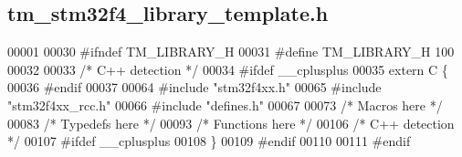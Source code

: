\hypertarget{tm__stm32f4__library__template_8h_source}{}\subsection{tm\+\_\+stm32f4\+\_\+library\+\_\+template.\+h}

\begin{DoxyCode}
00001 
00030 \textcolor{preprocessor}{#ifndef TM\_LIBRARY\_H}
00031 \textcolor{preprocessor}{#define TM\_LIBRARY\_H 100}
00032 
00033 \textcolor{comment}{/* C++ detection */}
00034 \textcolor{preprocessor}{#ifdef \_\_cplusplus}
00035 \textcolor{keyword}{extern} C \{
00036 \textcolor{preprocessor}{#endif}
00037 
00064 \textcolor{preprocessor}{#include "stm32f4xx.h"}
00065 \textcolor{preprocessor}{#include "stm32f4xx\_rcc.h"}
00066 \textcolor{preprocessor}{#include "defines.h"}
00067 
00073 \textcolor{comment}{/* Macros here */}
00083 \textcolor{comment}{/* Typedefs here */}
00093 \textcolor{comment}{/* Functions here */}
00106 \textcolor{comment}{/* C++ detection */}
00107 \textcolor{preprocessor}{#ifdef \_\_cplusplus}
00108 \}
00109 \textcolor{preprocessor}{#endif}
00110 
00111 \textcolor{preprocessor}{#endif}
\end{DoxyCode}
